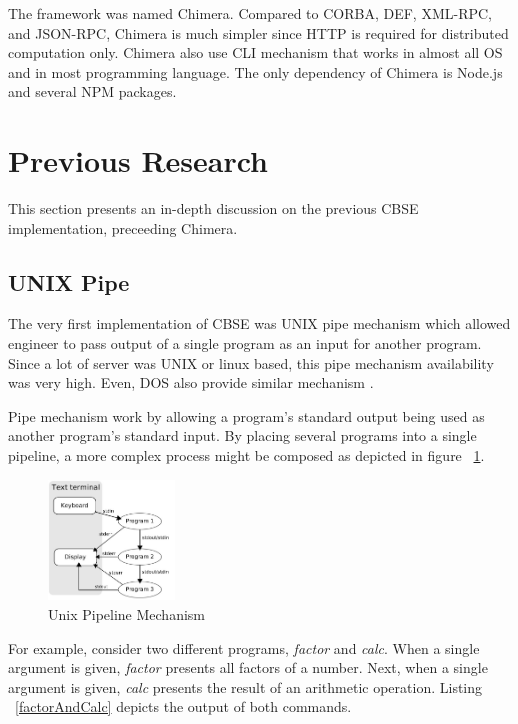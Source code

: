 \documentclass[conference]{IEEEtran}
\begin{document}
The framework was named Chimera. Compared to CORBA, DEF, XML-RPC, and JSON-RPC, 
Chimera is much simpler since HTTP is required for distributed computation only. 
Chimera also use CLI mechanism that works in almost all OS and in most programming language.
The only dependency of Chimera is Node.js and several NPM packages.

\section{Previous Research}

This section presents an in-depth discussion on the previous CBSE implementation,  
preceeding Chimera.


\subsection{UNIX Pipe}

The very first implementation of CBSE was UNIX pipe mechanism \cite{mcilroy1968mass} 
which allowed engineer to pass output of a single program as an input for 
another program. Since a lot of server was UNIX or linux based, this pipe 
mechanism availability was very high. Even, DOS also provide similar mechanism 
\cite{dos7command}.

Pipe mechanism work by allowing a program's standard output being used as another
program's standard input. By placing several programs into a single pipeline, 
a more complex process might be composed as depicted in figure ~\ref{fig:unixPipe}.

\begin{figure}
	\centering
	\includegraphics[width=0.3\textwidth]
		{images/Pipeline.jpg}
	\caption{Unix Pipeline Mechanism}
	\label{fig:unixPipe}
\end{figure}

For example, consider two different programs,
{\it factor} and {\it calc}. When a single argument is given, {\it factor} presents all 
factors of a number. Next, when a single argument is given, {\it calc} presents the result 
of an arithmetic operation. Listing ~\ref{factorAndCalc} depicts the output of both commands.
\end{document}
